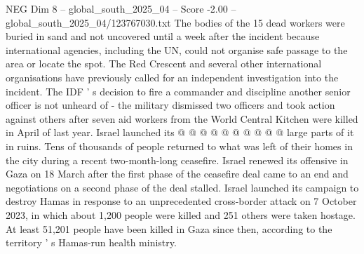 \begin{textsample}{NEG Dim 8 – global\_south\_2025\_04 – Score -2.00 – global\_south\_2025\_04/123767030.txt}
The bodies of the 15 dead workers were buried in sand and not uncovered until a week after the incident because international agencies, including the UN, could not organise safe passage to the area or locate the spot.
The Red Crescent and several other international organisations have previously called for an independent investigation into the incident.
The IDF ' s decision to fire a commander and discipline another senior officer is not unheard of - the military dismissed two officers and took action against others after seven aid workers from the World Central Kitchen were killed in April of last year.
Israel launched its @ @ @ @ @ @ @ @ @ @ large parts of it in ruins.
Tens of thousands of people returned to what was left of their homes in the city during a recent two-month-long ceasefire.
Israel renewed its offensive in Gaza on 18 March after the first phase of the ceasefire deal came to an end and negotiations on a second phase of the deal stalled.
Israel launched its campaign to destroy Hamas in response to an unprecedented cross-border attack on 7 October 2023, in which about 1,200 people were killed and 251 others were taken hostage.
At least 51,201 people have been killed in Gaza since then, according to the territory ' s Hamas-run health ministry.

\end{textsample}
